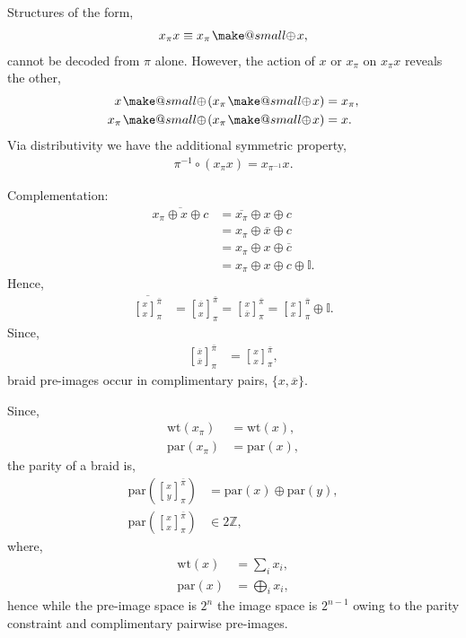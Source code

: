\documentclass[twocolumn, aps, amsmath, amssymb, nofootinbib, superscriptaddress, longbibliography, doublefloatfix, table-of-contents, eqsecnum, rmp]{revtex4-2}
\makeatletter
\newcommand{\stackbraid}[2]{{\genfrac{[}{]}{0pt}{}{{#1}}{{#2}}}^{\bar{\pi}}_{\pi}}
\newcommand{\soplus}{{{\hspace{1pt}}{\mathbin{\mathpalette\make@small{\mathbin\oplus}}}}{\hspace{1pt}}}
\newcommand{\make@small}[2]{%
  \vcenter{\hbox{%
    \scalebox{0.6}{$\m@th#1#2$}%
  }}%
}
\makeatother
\begin{document}
Structures of the form,
\begin{align}
	x_\pi x \equiv x_\pi \soplus x,
\end{align}
cannot be decoded from $\pi$ alone. However, the action of $x$ or $x_\pi$ on $x_\pi x$ reveals the other,
\begin{align}
	x \soplus (x_\pi \soplus x) & = x_\pi,\nonumber\\
	x_\pi \soplus (x_\pi \soplus x) &= x.
\end{align}
Via distributivity we have the additional symmetric property,
\begin{align}
	\pi^{-1} \circ (x_\pi x)	 = x_{\pi^{-1}} x.
\end{align}

Complementation:
\begin{align}
	\overline{x_\pi \oplus x \oplus c} &= \overline{x_\pi} \oplus x \oplus c \nonumber\\
	&= x_\pi \oplus \overline{x} \oplus c \nonumber\\
	&= x_\pi \oplus x \oplus \overline{c} \nonumber\\
	&= x_\pi \oplus x \oplus c \oplus \mathbb{I}.
\end{align}
Hence,
\begin{align}
	\overline{\stackbraid{x}{x}} &= \stackbraid{\overline{x}}{x} = \stackbraid{x}{\overline{x}} = \stackbraid{x}{x} \oplus \mathbb{I}.%
\end{align}
Since,
\begin{align}
	\stackbraid{\overline{x}}{\overline{x}} &= \stackbraid{x}{x},
\end{align}
braid pre-images occur in complimentary pairs, $\{x,\overline{x}\}$.

Since,
\begin{align}
	\mathrm{wt}(x_\pi) &= \mathrm{wt}(x),\nonumber\\
	\mathrm{par}(x_\pi) &= \mathrm{par}(x),
\end{align}
the parity of a braid is,
\begin{align}
	\mathrm{par}\left(\stackbraid{x}{y}\right) &= \mathrm{par}(x) \oplus \mathrm{par}(y),\nonumber\\
	\mathrm{par}\left(\stackbraid{x}{x}\right) &\in 2\mathbb{Z},
\end{align}
where,
\begin{align}
	\mathrm{wt}(x) &= \sum_i x_i,\nonumber\\
	\mathrm{par}(x) &= \bigoplus_i x_i,	
\end{align}
hence while the pre-image space is $2^n$ the image space is $2^{n-1}$ owing to the parity constraint and complimentary pairwise pre-images.
\end{document}
